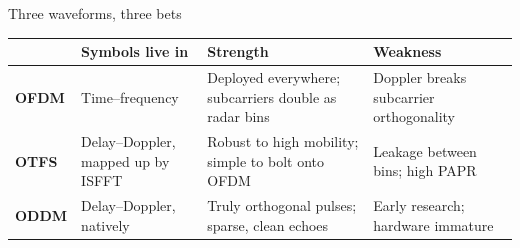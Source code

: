 \begin{frame}{Three waveforms, three bets}
  \vspace{0.2em}
  \scriptsize
  \setlength{\tabcolsep}{4pt}
  \renewcommand{\arraystretch}{1.30}
  \begin{tabularx}{\textwidth}{>{\bfseries}p{1.1cm}
      >{\raggedright\arraybackslash}p{2.1cm}
      >{\raggedright\arraybackslash}X
      >{\raggedright\arraybackslash}X}
    \toprule
    & \textbf{Symbols live in} & \textbf{Strength} & \textbf{Weakness} \\
    \midrule
    OFDM & Time--frequency & Deployed everywhere; subcarriers double as radar bins &
      Doppler breaks subcarrier orthogonality \\
    OTFS & Delay--Doppler, mapped up by ISFFT & Robust to high mobility; simple to
      bolt onto OFDM & Leakage between bins; high PAPR \\
    ODDM & Delay--Doppler, natively & Truly orthogonal pulses; sparse, clean echoes &
      Early research; hardware immature \\
    \bottomrule
  \end{tabularx}


  \vspace{0.4em}
\end{frame}

